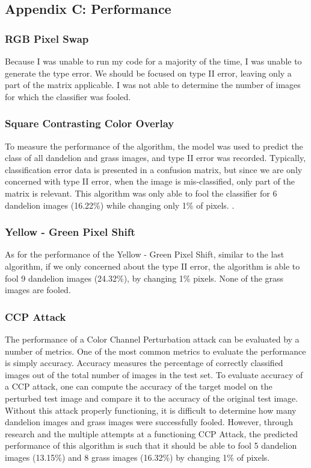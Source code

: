 \documentclass{article}
\begin{document}
\subsection{Appendix C: Performance}
\subsubsection{RGB Pixel Swap}
Because I was unable to run my code for a majority of the time, I was unable to generate the type error. We should be focused on type II error, leaving only a part of the matrix applicable. I was not able to determine the number of images for which the classifier was fooled. 

\subsubsection{Square Contrasting Color Overlay}
To measure the performance of the algorithm, the model was used to predict the class of all dandelion and grass images, and type II error was recorded. Typically, classification error data is presented in a confusion matrix, but since we are only concerned with type II error, when the image is mis-classified, only part of the matrix is relevant. This algorithm was only able to fool the classifier for 6 dandelion images (16.22\%) while changing only 1\% of pixels. .

\subsubsection{Yellow - Green Pixel Shift}
As for the performance of the Yellow - Green Pixel Shift, similar to the last algorithm, if we only concerned about the type II error, the algorithm is able to fool 9 dandelion images (24.32\%), by changing 1\% pixels. None of the grass images are fooled.  

\subsubsection{CCP Attack}
The performance of a Color Channel Perturbation attack can be evaluated by a number of metrics. One of the most common metrics to evaluate the performance is simply accuracy. Accuracy measures the percentage of correctly classified images out of the total number of images in the test set. To evaluate accuracy of a CCP attack, one can compute the accuracy of the target model on the perturbed test image and compare it to the accuracy of the original test image. Without this attack properly functioning, it is difficult to determine how many dandelion images and grass images were successfully fooled. However, through research and the multiple attempts at a functioning CCP Attack, the predicted performance of this algorithm is such that it should be able to fool 5 dandelion images (13.15\%) and 8 grass images (16.32\%) by changing 1\% of pixels.  
\end{document}
